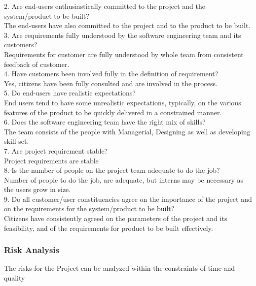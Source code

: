 \documentclass[12pt,a4paper]
{article}
\numberwithin{table}{section}
\begin{document}
{{{{{2.	Are end-users enthusiastically committed to the project and the system/product to be built? \\
The end-users have also committed to the project and to the product to be built.\\

3.	Are requirements fully understood by the software engineering team and its customers? \\
Requirements for customer are fully understood by whole team from consistent feedback of customer.\\	


4.	Have customers been involved fully in the definition of requirement?\\
Yes, citizens have been fully consulted and are involved in the process. \\


5.	Do end-users have realistic expectations?\\
End users tend to have some unrealistic expectations, typically, on the various features of the product to be quickly delivered in a constrained manner. \\


6.	Does the software engineering team have the right mix of skills?\\
The team consists of the people with Managerial, Designing as well as developing skill set. \\



7.	Are project requirement stable? \\
Project requirements are stable \\

8.	Is the number of people on the project team adequate to do the job? \\
Number of people to do the job, are adequate, but interns may be necessary as the users grow in size. \\

9.	Do all customer/user constituencies agree on the importance of the project and on the requirements for the system/product to be built? \\
Citizens have consistently agreed on the parameters of the project and its feasibility, and of the requirements for product to be built effectively. \\

\newpage

\subsubsection{Risk Analysis}
The risks for the Project can be analyzed within the constraints of time and quality


}}}}}
\end{document}
